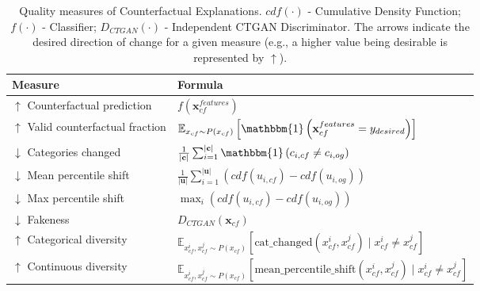 \documentclass[runningheads]{llncs}
\begin{document}
\begin{sidewaystable}[h!]
    \centering
    \renewcommand{\arraystretch}{1.3} %
    \setlength{\tabcolsep}{8pt} %
    \begin{tabular}{p{4cm} p{9cm}} 
        \toprule
        \textbf{Measure} & \textbf{Formula} \\ 
        \midrule
        $\uparrow$ Counterfactual prediction \label{meas: cf pred} & 
        $f\left(\textbf{x}^{features}_{cf}\right)$ \\ 
        
        $\uparrow$ Valid counterfactual fraction & 
        $\mathbb{E}_{x_{cf} \sim P(x_{cf})} \left[ \mathbbm{1}\left(\textbf{x}^{features}_{cf} = y_{desired}\right) \right]$ \\ 
        
        $\downarrow$ Categories changed \label{meas: cat changed} \cite{mothilal2020explaining} & 
        $\frac{1}{\left|\mathbf{c}\right|}\sum_{i=1}^{\left|\mathbf{c}\right|}\mathbbm{1}\left(c_{i,cf} \neq c_{i, og}\right)$ \\ 
        
        $\downarrow$ Mean percentile shift \label{meas: mean perc shift} \cite{pawelczyk2020learning} & 
        $\frac{1}{\left|\mathbf{u}\right|}\sum_{i=1}^{\left|\mathbf{u}\right|}\left(cdf\left(u_{i, cf}\right) - cdf\left(u_{i, og}\right)\right)$ \\ 
        
        $\downarrow$ Max percentile shift \label{meas: max perc shift} \cite{pawelczyk2020learning} & 
        $\max_{i}\left(cdf\left(u_{i, cf}\right) - cdf\left(u_{i, og}\right)\right)$ \\ 
        
        $\downarrow$ Fakeness \label{meas: fakeness} & 
        $D_{CTGAN}\left(\mathbf{x}_{cf}\right)$ \\ 
        
        $\uparrow$ Categorical diversity \label{meas: cat div} \cite{mothilal2020explaining} & 
        $\mathbb{E}_{x^{i}_{cf}, x^{j}_{cf} \sim P(x_{cf})} \left[ \text{cat\_changed}(x^{i}_{cf}, x^{j}_{cf}) \mid x^{i}_{cf} \neq x^{j}_{cf} \right]$ \\ 
        
        $\uparrow$ Continuous diversity \label{meas: cont div} \cite{mothilal2020explaining} & 
        $\mathbb{E}_{x^{i}_{cf}, x^{j}_{cf} \sim P(x_{cf})} \left[ \text{mean\_percentile\_shift}(x^{i}_{cf}, x^{j}_{cf}) \mid x^{i}_{cf} \neq x^{j}_{cf} \right]$ \\ 
        \bottomrule
    \end{tabular}
    \caption{Quality measures of Counterfactual Explanations. 
    $cdf(\cdot)$ - Cumulative Density Function; 
    $f(\cdot)$ - Classifier; 
    $D_{CTGAN}\left(\cdot\right)$ - Independent CTGAN Discriminator.  The arrows indicate the desired direction of change for a given measure (e.g., a higher value being desirable is represented by $\uparrow$).} 
    \label{tab:measures}
\end{sidewaystable}
\end{document}
